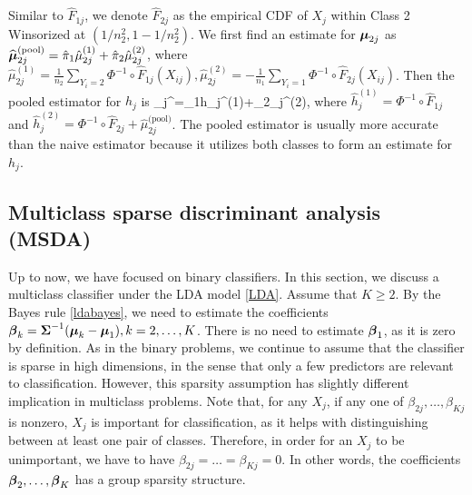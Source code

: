 Similar to $\hat{F}_{1j}$, we denote $\hat{F}_{2j}$ as the empirical CDF of $X_j$ within Class 2 Winsorized at $(1/n_2^2,1-1/n_2^2)$. We first find an estimate for $\boldsymbol{\mu}_{2j} $ as $\widehat{\boldsymbol{\mu}}^{\text{(pool)}}_{2j}=\hat{\pi}_1\hat\mu_{2j}^{(1)}+\hat{\pi}_2\hat\mu_{2j}^{(2)}$, where $\hat\mu_{2j}^{(1)}=\frac{1}{n_2}\sum_{Y_i=2}\Phi^{-1}\circ \hat F_{1j}(X_{ij}), \hat\mu_{2j}^{(2)}=-\frac{1}{n_1}\sum_{Y_i=1}\Phi^{-1}\circ \hat F_{2j}(X_{ij})$. Then the pooled estimator for $h_j$ is
\beq
{}_j^{}=\hat{\pi}_1\hat h_j^{(1)}+\hat{\pi}_2_j^{(2)},
\eeq 
where $\hat{h}_j^{(1)}=\Phi^{-1}\circ \widehat{F}_{1j}$ and $\hat{h}_j^{(2)}=\Phi^{-1}\circ \widehat{F}_{2j}+\hat{\mu}^{\text{(pool)}}_{2j}$. The pooled estimator is usually more accurate than the naive estimator because it utilizes both classes to form an estimate for $h_j$.




% 




\subsection{Multiclass sparse discriminant analysis (MSDA)}\label{msdamodel}

Up to now, we have focused on binary classifiers. In this section, we discuss a multiclass classifier under the LDA model \eqref{LDA}. Assume that $K\ge 2$. By the Bayes rule \eqref{ldabayes}, we need to estimate the coefficients $\boldsymbol{\beta}_k=\boldsymbol{\Sigma}^{-1}(\boldsymbol{\mu}_k-\boldsymbol{\mu}_1), k=2,\ldots,K$. There is no need to estimate $\boldsymbol{\beta}_1$, as it is zero by definition. As in the binary problems, we continue to assume that the classifier is sparse in high dimensions, in the sense that only a few predictors are relevant to classification. However, this sparsity assumption has slightly different implication in multiclass problems. Note that, for any $X_j$, if any one of $\beta_{2j},\ldots,\beta_{Kj}$ is nonzero, $X_j$ is important for classification, as it helps with distinguishing between at least one pair of classes. Therefore, in order for an $X_j$ to be unimportant, we have to have $\beta_{2j}=\ldots=\beta_{Kj}=0$. In other words, the coefficients $\boldsymbol{\beta}_2,\ldots,\boldsymbol{\beta}_K$ has a group sparsity structure.


